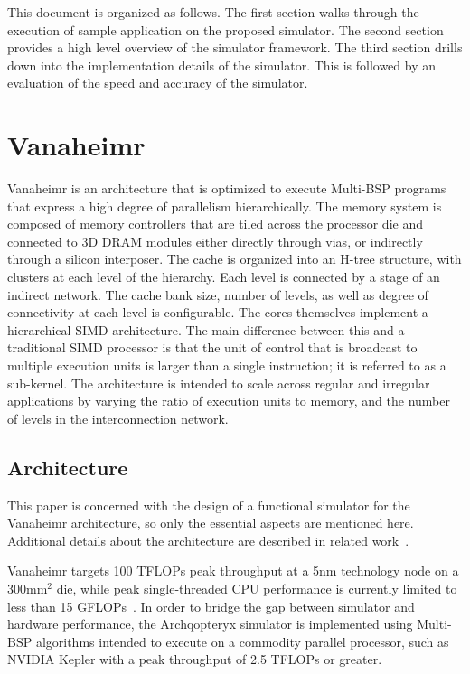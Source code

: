 \documentclass[conference, 10pt]{IEEEtran}
\begin{document}
This document is organized as follows.  The first section walks through the
execution of sample application on the proposed simulator.  The second section
provides a high level overview of the simulator framework.  The third section
drills down into the implementation details of the simulator.  This is followed
by an evaluation of the speed and accuracy of the simulator.


\section{Vanaheimr}
\label{sec:vanaheimr}

Vanaheimr is an architecture that is optimized to execute Multi-BSP programs
that express a high degree of parallelism hierarchically.  The memory system
is composed of memory controllers that are tiled across the processor die
and connected to 3D DRAM modules either directly through vias, or
indirectly through a silicon interposer.  The cache is organized
into an H-tree structure, with clusters at each level of the hierarchy.  Each
level is connected by a stage of an indirect network.  The cache bank size,
number of levels, as well as degree of connectivity at each level is
configurable.  The cores themselves implement a hierarchical SIMD architecture.
The main difference between this and a traditional SIMD processor is that the
unit of control that is broadcast to multiple execution units is larger than
a single instruction; it is referred to as a sub-kernel.  The architecture
is intended to scale across regular and irregular applications by varying the
ratio of execution units to memory, and the number of levels in the
interconnection network.  

\subsection{Architecture}
This paper is concerned with the design of a functional simulator for the
Vanaheimr architecture, so only the essential aspects are mentioned here. 
Additional details about the architecture are described in related
work~\cite{ref:vanaheimr}.  

Vanaheimr targets 100 TFLOPs peak throughput at a 5nm technology node on a
300mm$^2$ die, while peak single-threaded CPU performance is currently limited
to less than 15 GFLOPs~\cite{ref:sandybridge-peak}.  In order to bridge the gap
between simulator and hardware performance, the Archqopteryx simulator is
implemented using Multi-BSP algorithms intended to execute on a commodity
parallel processor, such as NVIDIA Kepler with a peak throughput of 2.5 TFLOPs
or greater.
\end{document}
